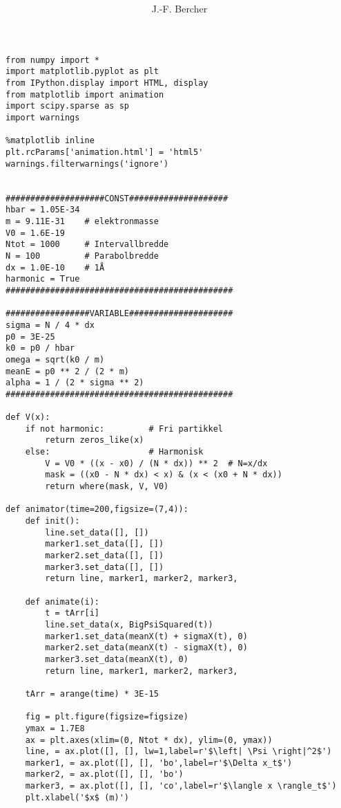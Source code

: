 \documentclass[11pt]{article}
\title{ }
\author{J.-F. Bercher}
\begin{document}
    
    
    \maketitle
    
\tableofcontents

    


\begin{lstlisting}
from numpy import *
import matplotlib.pyplot as plt
from IPython.display import HTML, display
from matplotlib import animation
import scipy.sparse as sp
import warnings

%matplotlib inline
plt.rcParams['animation.html'] = 'html5'
warnings.filterwarnings('ignore')


####################CONST####################
hbar = 1.05E-34
m = 9.11E-31    # elektronmasse
V0 = 1.6E-19
Ntot = 1000     # Intervallbredde
N = 100         # Parabolbredde
dx = 1.0E-10    # 1Å
harmonic = True
##############################################

#################VARIABLE#####################
sigma = N / 4 * dx
p0 = 3E-25
k0 = p0 / hbar
omega = sqrt(k0 / m)
meanE = p0 ** 2 / (2 * m)
alpha = 1 / (2 * sigma ** 2)
##############################################

def V(x):
    if not harmonic:         # Fri partikkel
        return zeros_like(x)
    else:                    # Harmonisk
        V = V0 * ((x - x0) / (N * dx)) ** 2  # N=x/dx
        mask = ((x0 - N * dx) < x) & (x < (x0 + N * dx))
        return where(mask, V, V0)
    
def animator(time=200,figsize=(7,4)):
    def init():
        line.set_data([], [])
        marker1.set_data([], [])
        marker2.set_data([], [])
        marker3.set_data([], [])
        return line, marker1, marker2, marker3,

    def animate(i):
        t = tArr[i]
        line.set_data(x, BigPsiSquared(t))
        marker1.set_data(meanX(t) + sigmaX(t), 0)
        marker2.set_data(meanX(t) - sigmaX(t), 0)
        marker3.set_data(meanX(t), 0)
        return line, marker1, marker2, marker3,

    tArr = arange(time) * 3E-15

    fig = plt.figure(figsize=figsize)
    ymax = 1.7E8 
    ax = plt.axes(xlim=(0, Ntot * dx), ylim=(0, ymax))
    line, = ax.plot([], [], lw=1,label=r'$\left| \Psi \right|^2$')
    marker1, = ax.plot([], [], 'bo',label=r'$\Delta x_t$')
    marker2, = ax.plot([], [], 'bo')
    marker3, = ax.plot([], [], 'co',label=r'$\langle x \rangle_t$')
    plt.xlabel('$x$ (m)')


\end{lstlisting}
\end{document}
